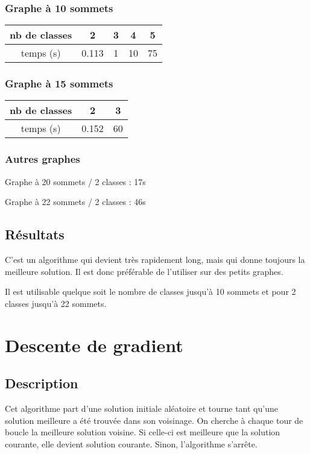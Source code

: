 \documentclass[12pt]{article}
\begin{document}
\subsubsection{Graphe à 10 sommets}

\begin{tabular}{|c|c|c|c|c|}
	\hline 
	nb de classes & 2 & 3 & 4 & 5 \\
	\hline
	temps (s) & 0.113 & 1 & 10 & 75 \\
	\hline
\end{tabular}

\subsubsection{Graphe à 15 sommets}

\begin{tabular}{|c|c|c |}
	\hline 
	nb de classes & 2 & 3 \\
	\hline
	temps (s) & 0.152 & 60 \\
	\hline
\end{tabular}

\subsubsection{Autres graphes}
Graphe à 20 sommets / 2 classes : 17s

Graphe à 22 sommets / 2 classes : 46s

\subsection{Résultats}
C'est un algorithme qui devient très rapidement long, mais qui donne toujours la meilleure solution. Il est donc préférable de l'utiliser sur des petits graphes.

Il est utilisable quelque soit le nombre de classes jusqu’à 10 sommets et pour 2 classes jusqu’à 22 sommets.

\newpage

\section{Descente de gradient}
\subsection{Description}
Cet algorithme part d’une solution initiale aléatoire et tourne tant qu’une solution meilleure a été trouvée dans son voisinage. On cherche à chaque tour de boucle la meilleure solution voisine. Si celle-ci est meilleure que la solution courante, elle devient solution courante. Sinon, l’algorithme s’arrête.
\end{document}
